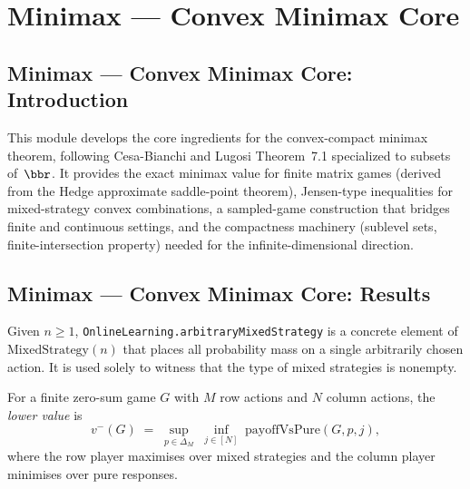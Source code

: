 \section{Minimax --- Convex Minimax Core}
\subsection*{Minimax --- Convex Minimax Core: Introduction}

This module develops the core ingredients for the convex-compact minimax theorem,
following Cesa-Bianchi and Lugosi Theorem~7.1 specialized to subsets of~$\bbr$.
It provides the exact minimax value for finite matrix games (derived from the
Hedge approximate saddle-point theorem), Jensen-type inequalities for
mixed-strategy convex combinations, a sampled-game construction that bridges
finite and continuous settings, and the compactness machinery (sublevel sets,
finite-intersection property) needed for the infinite-dimensional direction.

\subsection*{Minimax --- Convex Minimax Core: Results}

\begin{definition}
\label{OnlineLearning.arbitraryMixedStrategy}
\leanok
{}
Given $n \geq 1$, \texttt{OnlineLearning.arbitraryMixedStrategy} is a concrete
element of $\mathrm{MixedStrategy}(n)$ that places all probability mass on a
single arbitrarily chosen action. It is used solely to witness that the type
of mixed strategies is nonempty.
\end{definition}

\begin{definition}
\label{OnlineLearning.finiteLowerValue}
\leanok
{}
For a finite zero-sum game $G$ with $M$ row actions and $N$ column actions,
the \emph{lower value} is
\[
  v^- (G) \;=\; \sup_{p \in \Delta_M}\; \inf_{j \in [N]}\; \mathrm{payoffVsPure}(G,p,j),
\]
where the row player maximises over mixed strategies and the column player
minimises over pure responses.
\end{definition}

